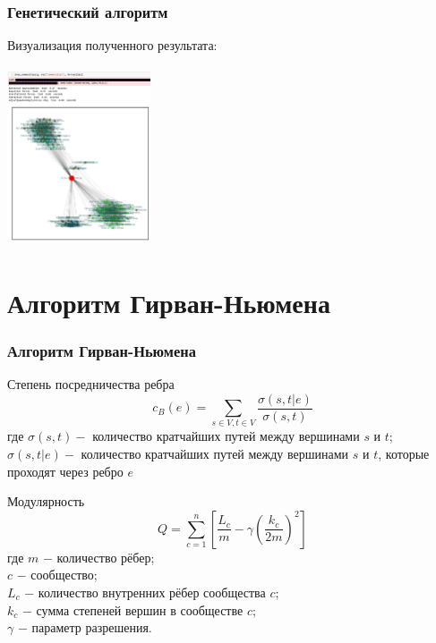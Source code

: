 \documentclass{spbseu}
\begin{document}
    \begin{frame}
		\frametitle{Генетический алгоритм}
        Визуализация полученного результата:
        \begin{center}
            \includegraphics[width=160px,height=200px]{images/ga_results}
        \end{center}
    \end{frame}
    
    \section{Алгоритм Гирван-Ньюмена}

    \begin{frame}
		\frametitle{Алгоритм Гирван-Ньюмена}
        \vspace{-12pt}
        \begin{block}{Степень посредничества ребра}
            \justifying
            \[ c_B(e) = \sum_{s \in V, t \in V} \dfrac{\sigma(s,t|e)}{\sigma(s,t)}\]
            где $\sigma(s, t) -$ количество кратчайших путей между вершинами $s$ и $t$;\\
            $\sigma(s,t|e) -$ количество кратчайших путей между вершинами $s$ и $t$, которые проходят через ребро $e$\\
        \end{block}
        \vspace{-6pt}
        \pause
        \begin{block}{Модулярность}
            \justifying
            \[ Q = \sum_{c=1}^n \left[\dfrac{L_c}{m}-\gamma\left(\dfrac{k_c}{2m}\right)^2\right] \]
            где $m$ $-$ количество рёбер;\\
            $c$ $-$ сообщество;\\
            $L_c$ $-$ количество внутренних рёбер сообщества $c$;\\
            $k_c$ $-$ сумма степеней вершин в сообществе $c$;\\
            $\gamma$ $-$ параметр разрешения.
        \end{block}
        \tableofcontents[part=5, pausesections]
    \end{frame}
    
\end{document}
